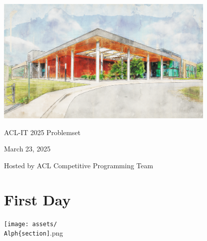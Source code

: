 \documentclass[12pt]{article}
\makeatletter
\newenvironment{problem}
{%
  \newcommand{\problemtitle}[1]{\def\@problemtitle{##1}}
  \newcommand{\problemdesc}[1]{\def\@problemdesc{##1}}
  \newcommand{\probleminput}[1]{\def\@probleminput{##1}}
  \newcommand{\problemoutput}[1]{\def\@problemoutput{##1}}
  \newcommand{\problemsamplein}[1]{\def\@problemsamplein{##1}}
  \newcommand{\problemsampleout}[1]{\def\@problemsampleout{##1}}
  \newcommand{\problemexplain}[1]{\def\@problemexplain{##1}}
  \def\@problemtitle{}
  \def\@problemdesc{}
  \def\@probleminput{}
  \def\@problemoutput{}
  \def\@problemsamplein{}
  \def\@problemsampleout{}
  \def\@problemexplain{}
}
{%
  \setlength\parindent{0pt}
  
  \section{\@problemtitle}

  {\hfill\texttt{[image: assets/\\Alph\{section]}.png}\hfill}
\makeatother
\begin{document}
\begin{titlepage}
  \setlength\parskip{0.2cm}
  \centering
  
  \includegraphics[width=0.8\textwidth]{./assets/acl.png}
  
  {\Huge ACL-IT 2025 Problemset}
  
  {\Large March 23, 2025}

  Hosted by ACL Competitive Programming Team
  
\end{titlepage}

\begin{problem}
  \problemtitle{First Day}
  \problemdesc{
    First day of school! Mr. Markley has everyone introduce themselves. Help
    Ralph introduce himself by saying ``Hello I’m Ralph!'' to others around him.
  }
  \probleminput{
    You will be given a single newline-terminated string. The length of the
    string will not exceed 100 characters (including the newline).
  }
  \problemoutput{
    Print out exactly ``Hello [\emph{input}] I'm Ralph!'', terminated by a newline.
  }
  \problemsamplein{%
    Dr. Priddy
    
    Ralph
  }
  \problemsampleout{%
    Hello Dr. Priddy I'm Ralph!

    Hello Ralph I'm Ralph!
  }
  \problemexplain{Explain the sample test cases here.}
\end{problem}
\end{document}
